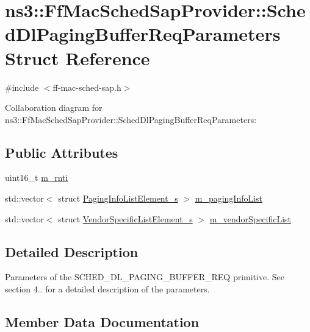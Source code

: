 \hypertarget{structns3_1_1FfMacSchedSapProvider_1_1SchedDlPagingBufferReqParameters}{}\section{ns3\+:\+:Ff\+Mac\+Sched\+Sap\+Provider\+:\+:Sched\+Dl\+Paging\+Buffer\+Req\+Parameters Struct Reference}
\label{structns3_1_1FfMacSchedSapProvider_1_1SchedDlPagingBufferReqParameters}


{\ttfamily \#include $<$ff-\/mac-\/sched-\/sap.\+h$>$}



Collaboration diagram for ns3\+:\+:Ff\+Mac\+Sched\+Sap\+Provider\+:\+:Sched\+Dl\+Paging\+Buffer\+Req\+Parameters\+:
\subsection*{Public Attributes}
\begin{DoxyCompactItemize}
\item 
uint16\+\_\+t \hyperlink{structns3_1_1FfMacSchedSapProvider_1_1SchedDlPagingBufferReqParameters_a5b1c736b03afd80148570e019e07d18e}{m\+\_\+rnti}
\item 
std\+::vector$<$ struct \hyperlink{structns3_1_1PagingInfoListElement__s}{Paging\+Info\+List\+Element\+\_\+s} $>$ \hyperlink{structns3_1_1FfMacSchedSapProvider_1_1SchedDlPagingBufferReqParameters_aec82518f050a26f9bc201769d8878a0a}{m\+\_\+paging\+Info\+List}
\item 
std\+::vector$<$ struct \hyperlink{structns3_1_1VendorSpecificListElement__s}{Vendor\+Specific\+List\+Element\+\_\+s} $>$ \hyperlink{structns3_1_1FfMacSchedSapProvider_1_1SchedDlPagingBufferReqParameters_a9a404b3115872ade0306ae62c4821a4c}{m\+\_\+vendor\+Specific\+List}
\end{DoxyCompactItemize}


\subsection{Detailed Description}
Parameters of the S\+C\+H\+E\+D\+\_\+\+D\+L\+\_\+\+P\+A\+G\+I\+N\+G\+\_\+\+B\+U\+F\+F\+E\+R\+\_\+\+R\+EQ primitive. See section 4.. for a detailed description of the parameters. 

\subsection{Member Data Documentation}

